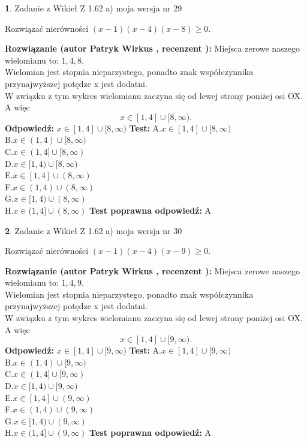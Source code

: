 \documentclass[12pt, a4paper]{article}
\theoremstyle{definition} %
\newtheorem{zad}{}
\newcommand{\zadStart}[1]{\begin{zad}#1\newline}
\newcommand{\zadStop}{\end{zad}}
\newcommand{\rozwStart}[2]{\noindent \textbf{Rozwiązanie (autor #1 , recenzent #2): }\newline}
\newcommand{\rozwStop}{\newline}
\newcommand{\odpStart}{\noindent \textbf{Odpowiedź:}\newline}
\newcommand{\odpStop}{\newline}
\newcommand{\testStart}{\noindent \textbf{Test:}\newline}
\newcommand{\testStop}{\newline}
\newcommand{\kluczStart}{\noindent \textbf{Test poprawna odpowiedź:}\newline}
\newcommand{\kluczStop}{\newline}
\begin{document}
\zadStart{Zadanie z Wikieł Z 1.62 a) moja wersja nr 29}

Rozwiązać nierówności $(x-1)(x-4)(x-8)\ge0$.
\zadStop
\rozwStart{Patryk Wirkus}{}
Miejsca zerowe naszego wielomianu to: $1, 4, 8$.\\
Wielomian jest stopnia nieparzystego, ponadto znak współczynnika przy\linebreak najwyższej potędze x jest dodatni.\\ W związku z tym wykres wielomianu zaczyna się od lewej strony poniżej osi OX. A więc $$x \in [1,4] \cup [8,\infty).$$
\rozwStop
\odpStart
$x \in [1,4] \cup [8,\infty)$
\odpStop
\testStart
A.$x \in [1,4] \cup [8,\infty)$\\
B.$x \in (1,4) \cup [8,\infty)$\\
C.$x \in (1,4] \cup [8,\infty)$\\
D.$x \in [1,4) \cup [8,\infty)$\\
E.$x \in [1,4] \cup (8,\infty)$\\
F.$x \in (1,4) \cup (8,\infty)$\\
G.$x \in [1,4) \cup (8,\infty)$\\
H.$x \in (1,4] \cup (8,\infty)$
\testStop
\kluczStart
A
\kluczStop



\zadStart{Zadanie z Wikieł Z 1.62 a) moja wersja nr 30}

Rozwiązać nierówności $(x-1)(x-4)(x-9)\ge0$.
\zadStop
\rozwStart{Patryk Wirkus}{}
Miejsca zerowe naszego wielomianu to: $1, 4, 9$.\\
Wielomian jest stopnia nieparzystego, ponadto znak współczynnika przy\linebreak najwyższej potędze x jest dodatni.\\ W związku z tym wykres wielomianu zaczyna się od lewej strony poniżej osi OX. A więc $$x \in [1,4] \cup [9,\infty).$$
\rozwStop
\odpStart
$x \in [1,4] \cup [9,\infty)$
\odpStop
\testStart
A.$x \in [1,4] \cup [9,\infty)$\\
B.$x \in (1,4) \cup [9,\infty)$\\
C.$x \in (1,4] \cup [9,\infty)$\\
D.$x \in [1,4) \cup [9,\infty)$\\
E.$x \in [1,4] \cup (9,\infty)$\\
F.$x \in (1,4) \cup (9,\infty)$\\
G.$x \in [1,4) \cup (9,\infty)$\\
H.$x \in (1,4] \cup (9,\infty)$
\testStop
\kluczStart
A
\kluczStop
\end{document}
